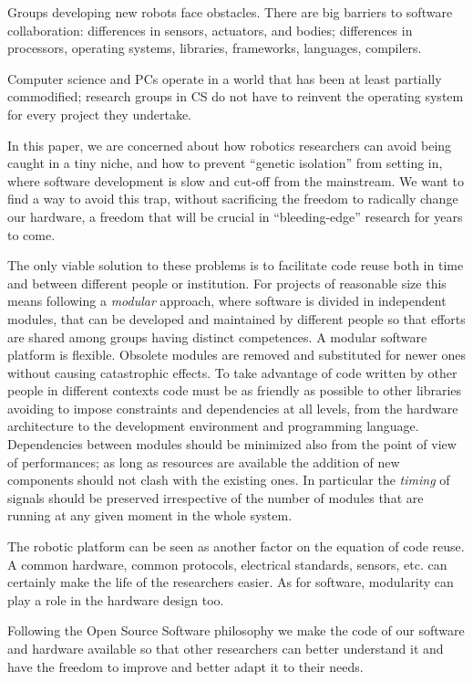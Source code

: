 Groups developing new robots face obstacles.  There are big barriers
to software collaboration: differences in sensors, actuators, and
bodies; differences in processors, operating systems, libraries,
frameworks, languages, compilers.


Computer science and PCs operate in a world that has been at least
partially commodified; research groups in CS do not have to 
reinvent the operating system for every project they undertake.


%
In this paper, we are concerned
about how robotics researchers can avoid being caught in a tiny
niche, and how to prevent ``genetic isolation'' from setting in,
where software development is slow and cut-off from the mainstream.
We want to find a way to avoid this trap, without sacrificing
the freedom to radically change our hardware, a freedom that
will be crucial in ``bleeding-edge'' research for years to come.

The only viable solution to these problems is to facilitate 
code reuse both in time and between different people or 
institution. For projects of reasonable size this means following
a \emph{modular} approach, where software is divided in 
independent modules, that can be developed and maintained 
by different people so that efforts 
are shared among groups having distinct competences. A 
modular software platform is flexible. Obsolete modules are 
removed and substituted for newer ones without causing 
catastrophic effects. To take advantage of code written by 
other people in different contexts code must be as friendly 
as possible to other libraries avoiding to impose constraints 
and dependencies at all levels, from the hardware architecture 
to the development environment and programming language. 
Dependencies between modules should be 
minimized also from the point of view of performances; as 
long as resources are available the addition of new 
components should not clash with the existing ones. In 
particular the \emph{timing} of signals should be preserved 
irrespective of the number of modules that are running 
at any given moment in the whole system. 

%
The robotic platform can be seen as another factor on the
equation of code reuse. A common hardware, common protocols,
electrical standards, sensors, etc. can certainly make the 
life of the researchers easier. As for software, modularity 
can play a role in the hardware design too. 

Following the Open Source Software philosophy we make the 
code of our software and hardware available so that other 
researchers can better understand it and have the freedom 
to improve and better adapt it to their needs.

